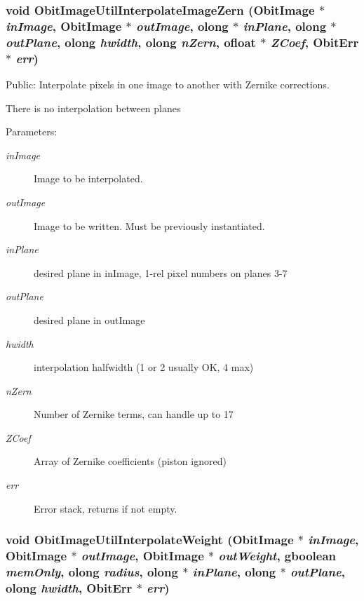 \subsubsection{\setlength{\rightskip}{0pt plus 5cm}void Obit\-Image\-Util\-Interpolate\-Image\-Zern ({\bf Obit\-Image} $\ast$ {\em in\-Image}, {\bf Obit\-Image} $\ast$ {\em out\-Image}, {\bf olong} $\ast$ {\em in\-Plane}, {\bf olong} $\ast$ {\em out\-Plane}, {\bf olong} {\em hwidth}, {\bf olong} {\em n\-Zern}, {\bf ofloat} $\ast$ {\em ZCoef}, {\bf Obit\-Err} $\ast$ {\em err})}\label{ObitImageUtil_8c_a10}


Public: Interpolate pixels in one image to another with Zernike corrections. 

There is no interpolation between planes \begin{Desc}
\item[Parameters:]
\begin{description}
\item[{\em in\-Image}]Image to be interpolated. \item[{\em out\-Image}]Image to be written. Must be previously instantiated. \item[{\em in\-Plane}]desired plane in in\-Image, 1-rel pixel numbers on planes 3-7 \item[{\em out\-Plane}]desired plane in out\-Image \item[{\em hwidth}]interpolation halfwidth (1 or 2 usually OK, 4 max) \item[{\em n\-Zern}]Number of Zernike terms, can handle up to 17 \item[{\em ZCoef}]Array of Zernike coefficients (piston ignored) \item[{\em err}]Error stack, returns if not empty. \end{description}
\end{Desc}
\subsubsection{\setlength{\rightskip}{0pt plus 5cm}void Obit\-Image\-Util\-Interpolate\-Weight ({\bf Obit\-Image} $\ast$ {\em in\-Image}, {\bf Obit\-Image} $\ast$ {\em out\-Image}, {\bf Obit\-Image} $\ast$ {\em out\-Weight}, gboolean {\em mem\-Only}, {\bf olong} {\em radius}, {\bf olong} $\ast$ {\em in\-Plane}, {\bf olong} $\ast$ {\em out\-Plane}, {\bf olong} {\em hwidth}, {\bf Obit\-Err} $\ast$ {\em err})}\label{ObitImageUtil_8c_a11}


